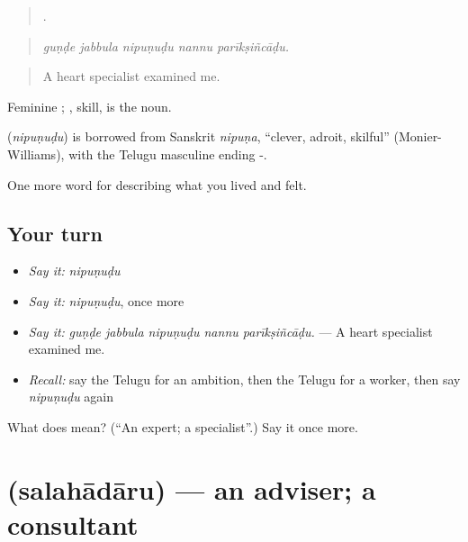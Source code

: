 \begin{quote}
    .
\end{quote}

\begin{quote}
\emph{guṇḍe jabbula nipuṇuḍu nannu parīkṣiñcāḍu.}
\end{quote}

\begin{quote}
A heart specialist examined me.
\end{quote}

Feminine ; , skill, is the noun.

\begin{cousinweb}
\textbf{} (\emph{nipuṇuḍu}) is borrowed from Sanskrit \emph{nipuṇa}, \textquotedblleft{}clever, adroit, skilful\textquotedblright{} (Monier-Williams), with the Telugu masculine ending -.
\end{cousinweb}

\begin{grammarlens}[title={What you've built}]
One more word for describing what you lived and felt.
\end{grammarlens}

\subsection*{Your turn}
\begin{itemize}
\raggedright
  \item \emph{Say it:} \emph{nipuṇuḍu}
  \item \emph{Say it:} \emph{nipuṇuḍu}, once more
  \item \emph{Say it:} \emph{guṇḍe jabbula nipuṇuḍu nannu parīkṣiñcāḍu.} — A heart specialist examined me.
  \item \emph{Recall:} say the Telugu for an ambition, then the Telugu for a worker, then say \emph{nipuṇuḍu} again
\end{itemize}

\begin{tcolorbox}[breakable,colback=teal!4,colframe=teal!35!black,title={Before you move on}]
What does  mean? (\textquotedblleft{}An expert; a specialist\textquotedblright{}.) Say it once more.
\end{tcolorbox}
\section[\texorpdfstring{\te{సలహాదారు} (salahādāru)}{సలహాదారు (salahādāru)}]{ (salahādāru) — an adviser; a consultant}


